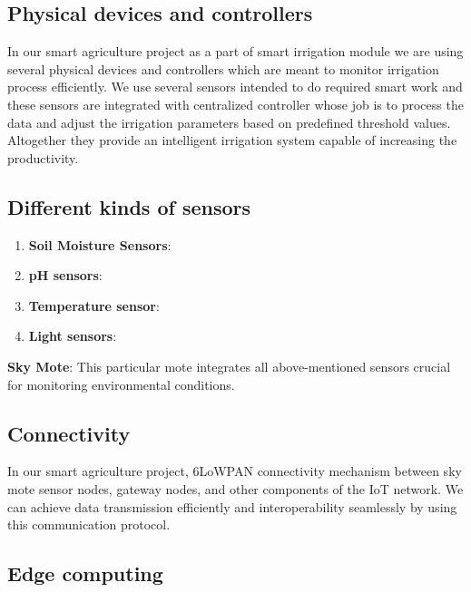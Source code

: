 \documentclass{article}
\begin{document}
\subsection{Physical devices and controllers}

In our smart agriculture project as a part of smart irrigation module we are using several physical devices and controllers which are meant to monitor irrigation process efficiently. We use several sensors intended to do required smart work and these sensors are integrated with centralized controller whose job is to process the data and adjust the irrigation parameters based on predefined threshold values. Altogether they provide an intelligent irrigation system capable of increasing the productivity.
\subsection*{Different kinds of sensors}

\begin{enumerate}
    \item \textbf{Soil Moisture Sensors}: 
    
    \item \textbf{pH sensors}: 
    
    \item \textbf{Temperature sensor}: 
    \item \textbf{Light sensors}:
\end{enumerate}

\textbf{Sky Mote}: This particular mote integrates all above-mentioned sensors crucial for monitoring environmental conditions.

\subsection{Connectivity}
\maketitle

In our smart agriculture project, 6LoWPAN connectivity mechanism between sky mote sensor nodes, gateway nodes, and other components of the IoT network. We can achieve data transmission efficiently and interoperability seamlessly by using this communication protocol. 

\subsection{Edge computing}
\end{document}
